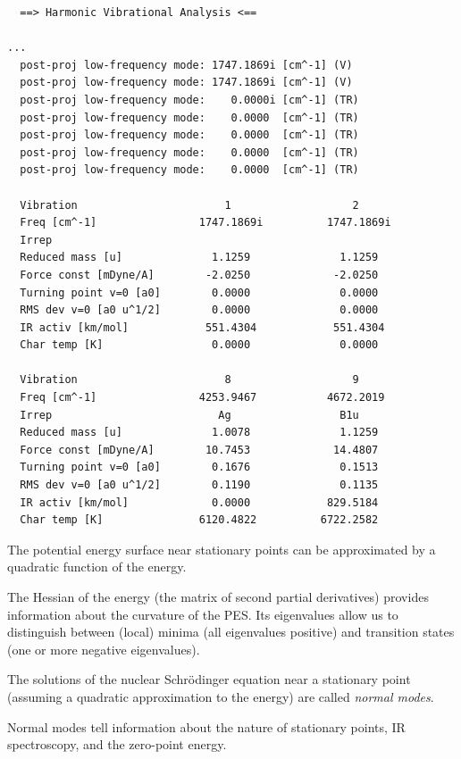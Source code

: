 \documentclass[../Main/notes.tex]{subfiles}
\begin{document}
\begin{small}
\begin{verbatim}
  ==> Harmonic Vibrational Analysis <==

...
  post-proj low-frequency mode: 1747.1869i [cm^-1] (V)
  post-proj low-frequency mode: 1747.1869i [cm^-1] (V)
  post-proj low-frequency mode:    0.0000i [cm^-1] (TR)
  post-proj low-frequency mode:    0.0000  [cm^-1] (TR)
  post-proj low-frequency mode:    0.0000  [cm^-1] (TR)
  post-proj low-frequency mode:    0.0000  [cm^-1] (TR)
  post-proj low-frequency mode:    0.0000  [cm^-1] (TR)

  Vibration                       1                   2           
  Freq [cm^-1]                1747.1869i          1747.1869i                 
  Irrep                                                                             
  Reduced mass [u]              1.1259              1.1259                      
  Force const [mDyne/A]        -2.0250             -2.0250                     
  Turning point v=0 [a0]        0.0000              0.0000                      
  RMS dev v=0 [a0 u^1/2]        0.0000              0.0000                      
  IR activ [km/mol]            551.4304            551.4304                     
  Char temp [K]                 0.0000              0.0000                  
  
  Vibration                       8                   9           
  Freq [cm^-1]                4253.9467           4672.2019       
  Irrep                          Ag                 B1u          
  Reduced mass [u]              1.0078              1.1259        
  Force const [mDyne/A]        10.7453             14.4807        
  Turning point v=0 [a0]        0.1676              0.1513        
  RMS dev v=0 [a0 u^1/2]        0.1190              0.1135        
  IR activ [km/mol]             0.0000            829.5184       
  Char temp [K]               6120.4822          6722.2582       
\end{verbatim}
\end{small}

\begin{summary}
\item The potential energy surface near stationary points can be approximated by a quadratic function of the energy.
\item The Hessian of the energy (the matrix of second partial derivatives) provides information about the curvature of the PES. Its eigenvalues allow us to distinguish between (local) minima (all eigenvalues positive) and transition states (one or more negative eigenvalues).
\item The solutions of the nuclear Schr\"{o}dinger equation near a stationary point (assuming a quadratic approximation to the energy) are called \emph{normal modes}.
\item Normal modes tell information about the nature of stationary points, IR spectroscopy, and the zero-point energy.
\end{summary}
\end{document}
